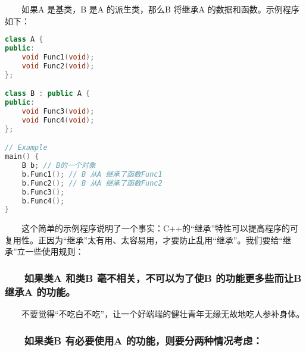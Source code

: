 \documentclass[11pt]{article}
\begin{document}
　　如果A 是基类，B 是A 的派生类，那么B 将继承A 的数据和函数。示例程序如下：
\begin{lstlisting}[language=c++]
class A {
public:
    void Func1(void);
    void Func2(void);
};

class B : public A {
public:
    void Func3(void);
    void Func4(void);
};

// Example
main() {
    B b; // B的一个对象
    b.Func1(); // B 从A 继承了函数Func1
    b.Func2(); // B 从A 继承了函数Func2
    b.Func3();
    b.Func4();
}
\end{lstlisting}

　　这个简单的示例程序说明了一个事实：C++的“继承”特性可以提高程序的可复用性。正因为“继承”太有用、太容易用，才要防止乱用“继承”。我们要给“继承”立一些使用规则：

\subsubsection{　　如果类A 和类B 毫不相关，不可以为了使B 的功能更多些而让B 继承A 的功能。}
\label{sec-1-2-1}

　　不要觉得“不吃白不吃”，让一个好端端的健壮青年无缘无故地吃人参补身体。
\subsubsection{　　如果类B 有必要使用A 的功能，则要分两种情况考虑：}
\label{sec-1-2-2}
\end{document}

